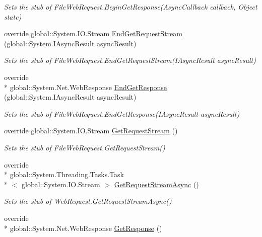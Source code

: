 \begin{DoxyCompactItemize}
\begin{DoxyCompactList}\small\item\em Sets the stub of File\-Web\-Request.\-Begin\-Get\-Response(\-Async\-Callback callback, Object state)\end{DoxyCompactList}\item 
override global\-::\-System.\-I\-O.\-Stream \hyperlink{class_system_1_1_net_1_1_fakes_1_1_stub_file_web_request_a99568d23481a5befc5cad1486e003013}{End\-Get\-Request\-Stream} (global\-::\-System.\-I\-Async\-Result async\-Result)
\begin{DoxyCompactList}\small\item\em Sets the stub of File\-Web\-Request.\-End\-Get\-Request\-Stream(\-I\-Async\-Result async\-Result)\end{DoxyCompactList}\item 
override \\*
global\-::\-System.\-Net.\-Web\-Response \hyperlink{class_system_1_1_net_1_1_fakes_1_1_stub_file_web_request_a8d9b383015b00993c417665969296e08}{End\-Get\-Response} (global\-::\-System.\-I\-Async\-Result async\-Result)
\begin{DoxyCompactList}\small\item\em Sets the stub of File\-Web\-Request.\-End\-Get\-Response(\-I\-Async\-Result async\-Result)\end{DoxyCompactList}\item 
override global\-::\-System.\-I\-O.\-Stream \hyperlink{class_system_1_1_net_1_1_fakes_1_1_stub_file_web_request_aefc67e36257ea8f96f755b426650860a}{Get\-Request\-Stream} ()
\begin{DoxyCompactList}\small\item\em Sets the stub of File\-Web\-Request.\-Get\-Request\-Stream()\end{DoxyCompactList}\item 
override \\*
global\-::\-System.\-Threading.\-Tasks.\-Task\\*
$<$ global\-::\-System.\-I\-O.\-Stream $>$ \hyperlink{class_system_1_1_net_1_1_fakes_1_1_stub_file_web_request_a2cfa78b877cb7262fe2ed00c4c8219bd}{Get\-Request\-Stream\-Async} ()
\begin{DoxyCompactList}\small\item\em Sets the stub of Web\-Request.\-Get\-Request\-Stream\-Async()\end{DoxyCompactList}\item 
override \\*
global\-::\-System.\-Net.\-Web\-Response \hyperlink{class_system_1_1_net_1_1_fakes_1_1_stub_file_web_request_a87c854638b105db2f71b8b78c71e07ff}{Get\-Response} ()

\end{DoxyCompactItemize}
